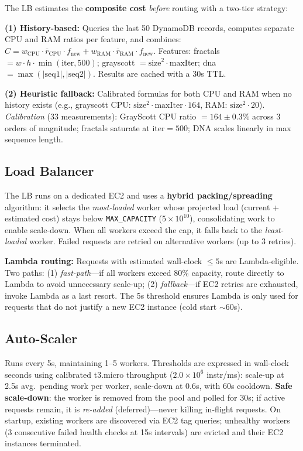 \documentclass[10pt,twocolumn]{article}
\begin{document}
The LB estimates the \textbf{composite cost} \emph{before} routing with a two-tier strategy:

\textbf{(1) History-based:} Queries the last 50 DynamoDB records, computes separate CPU and RAM ratios per feature, and combines: $\hat{C} = w_{\text{CPU}} \cdot \bar{r}_{\text{CPU}} \cdot f_{\text{new}} + w_{\text{RAM}} \cdot \bar{r}_{\text{RAM}} \cdot f_{\text{new}}$. Features: fractals $= w \!\cdot\! h \!\cdot\! \min(\text{iter}, 500)$; grayscott $= \text{size}^2 \!\cdot\! \text{maxIter}$; dna $= \max(|\text{seq1}|, |\text{seq2}|)$. Results are cached with a 30s TTL.

\textbf{(2) Heuristic fallback:} Calibrated formulas for both CPU and RAM when no history exists (e.g., grayscott CPU: $\text{size}^2 \!\cdot\! \text{maxIter} \!\cdot\! 164$, RAM: $\text{size}^2 \!\cdot\! 20$). \emph{Calibration} (33 measurements): GrayScott CPU ratio $= 164 \pm 0.3\%$ across 3 orders of magnitude; fractals saturate at iter$=500$; DNA scales linearly in max sequence length.

\subsection{Load Balancer}

The LB runs on a dedicated EC2 and uses a \textbf{hybrid packing/spreading} algorithm: it selects the \emph{most-loaded} worker whose projected load (current + estimated cost) stays below \texttt{MAX\_CAPACITY} ($5\!\times\!10^{10}$), consolidating work to enable scale-down. When all workers exceed the cap, it falls back to the \emph{least-loaded} worker. Failed requests are retried on alternative workers (up to 3 retries).

\textbf{Lambda routing:} Requests with estimated wall-clock $\leq 5$s are Lambda-eligible. Two paths: (1) \emph{fast-path}---if all workers exceed 80\% capacity, route directly to Lambda to avoid unnecessary scale-up; (2) \emph{fallback}---if EC2 retries are exhausted, invoke Lambda as a last resort. The 5s threshold ensures Lambda is only used for requests that do not justify a new EC2 instance (cold start $\sim$60s).

\subsection{Auto-Scaler}

Runs every 5s, maintaining 1--5 workers. Thresholds are expressed in wall-clock seconds using calibrated t3.micro throughput ($2.0\!\times\!10^{6}$ instr/ms): scale-up at 2.5s avg.\ pending work per worker, scale-down at 0.6s, with 60s cooldown. \textbf{Safe scale-down}: the worker is removed from the pool and polled for 30s; if active requests remain, it is \emph{re-added} (deferred)---never killing in-flight requests. On startup, existing workers are discovered via EC2 tag queries; unhealthy workers (3 consecutive failed health checks at 15s intervals) are evicted and their EC2 instances terminated.
\end{document}
